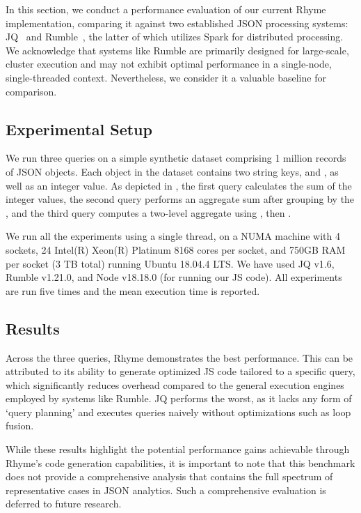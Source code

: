 \documentclass[runningheads]{llncs}
\newcommand{\lang}{Rhyme}
\begin{document}
In this section, we conduct a performance evaluation of our current \lang{}
implementation, comparing it against two established JSON processing
systems: JQ~\cite{jq} and Rumble~\cite{rumble_vldb}, the latter of which
utilizes Spark for distributed processing.
We acknowledge that systems like Rumble are primarily designed for large-scale,
cluster execution and may not exhibit optimal performance in a single-node,
single-threaded context.
Nevertheless, we consider it a valuable baseline for comparison.

\subsection{Experimental Setup}
We run three queries on a simple synthetic dataset comprising 1 million records of
JSON objects.
Each object in the dataset contains two string keys,  and , 
as well as an integer value.
As depicted in , the first query calculates the sum of the integer
values, the second query performs an aggregate sum after grouping by the ,
and the third query computes a two-level aggregate using , then .

We run all the experiments using a single thread, on a NUMA machine
with 4 sockets, 24 Intel(R) Xeon(R) Platinum 8168 cores
per socket, and 750GB RAM per socket (3 TB total) running Ubuntu
18.04.4 LTS.
We have used JQ v1.6, Rumble v1.21.0, and Node v18.18.0 (for running our JS code).
All experiments are run five times and the mean execution time is reported.

\subsection{Results}
Across the three queries, \lang{} demonstrates the best performance.
This can be attributed to its ability to generate optimized JS code tailored
to a specific query, which significantly reduces overhead compared to the
general execution engines employed by systems like Rumble.
JQ performs the worst, as it lacks any form of
`query planning' and executes queries naively without optimizations
such as loop fusion.

While these results highlight the potential performance gains achievable
through \lang{}'s code generation capabilities, it is important to note
that this benchmark does not provide a comprehensive analysis that contains the
full spectrum of representative cases in JSON analytics.
Such a comprehensive evaluation is deferred to future research.
\end{document}
